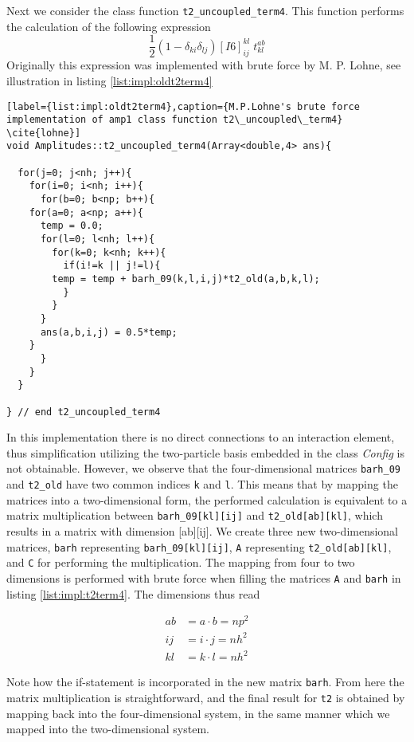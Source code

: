 Next we consider the class function \texttt{t2\_uncoupled\_term4}. This function performs the calculation of the following expression
\begin{equation*}
\frac{1}{2}(1-\delta_{ki}\delta_{lj})[I6]_{ij}^{kl}\phantom{.}t_{kl}^{ab}
\label{eq:impl:t2term4expression}
\end{equation*}
Originally this expression was implemented with brute force by M. P. Lohne, see illustration in listing \ref{list:impl:oldt2term4}
\begin{lstlisting}[label={list:impl:oldt2term4},caption={M.P.Lohne's brute force implementation of amp1 class function t2\_uncoupled\_term4} \cite{lohne}]
void Amplitudes::t2_uncoupled_term4(Array<double,4> ans){

  for(j=0; j<nh; j++){
    for(i=0; i<nh; i++){
      for(b=0; b<np; b++){
	for(a=0; a<np; a++){
	  temp = 0.0;
	  for(l=0; l<nh; l++){
	    for(k=0; k<nh; k++){
	      if(i!=k || j!=l){
		temp = temp + barh_09(k,l,i,j)*t2_old(a,b,k,l);
	      }
	    }
	  }
	  ans(a,b,i,j) = 0.5*temp;
	}
      }
    }
  }
  
} // end t2_uncoupled_term4
\end{lstlisting}
In this implementation there is no direct connections to an interaction element, thus simplification utilizing the two-particle basis embedded in the class \emph{Config} is not obtainable. However, we observe that the four-dimensional matrices \texttt{barh\_09} and \texttt{t2\_old} have two common indices \texttt{k} and \texttt{l}. This means that by mapping the matrices into a two-dimensional form, the performed calculation is equivalent to a matrix multiplication between \texttt{barh\_09[kl][ij]} and \texttt{t2\_old[ab][kl]}, which results in a matrix with dimension [ab][ij]. We create three new two-dimensional matrices, \texttt{barh} representing \texttt{barh\_09[kl][ij]}, \texttt{A} representing \texttt{t2\_old[ab][kl]}, and \texttt{C} for performing the multiplication. The mapping from four to two dimensions is performed with brute force when filling the matrices \texttt{A} and \texttt{barh} in listing \ref{list:impl:t2term4}. The dimensions thus read

\begin{align*}
ab &= a \cdot b=np^2 \\
ij &= i \cdot j=nh^2 \\
kl &= k \cdot l=nh^2
\label{eq:impl:t2term4dimensions}
\end{align*}

Note how the if-statement is incorporated in the new matrix \texttt{barh}. From here the matrix multiplication is straightforward, and the final result for \texttt{t2} is obtained by mapping back into the four-dimensional system, in the same manner which we mapped into the two-dimensional system.

